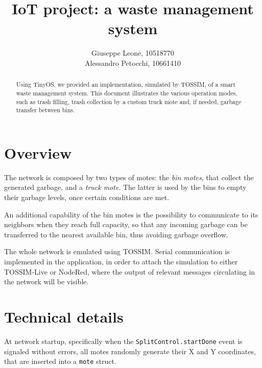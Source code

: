 \documentclass[a4paper,10pt]{article}
\title{IoT project: a waste management system}
\author{Giuseppe Leone, 10518770 \\ Alessandro Petocchi, 10661410}
\date{}
\begin{document}
\maketitle
\begin{abstract}
	\noindent Using TinyOS, we provided an implementation, simulated by TOSSIM, of a smart waste management system. This document illustrates the various operation modes, such as trash filling, trash collection by a custom truck mote and, if needed, garbage transfer between bins. 
\end{abstract}

\section{Overview}
The network is composed by two types of motes: the \textit{bin motes}, that collect the generated garbage, and a \textit{truck mote}. The latter is used by the bins to empty their garbage levels, once certain conditions are met.

\noindent An additional capability of the bin motes is the possibility to communicate to its neighbors when they reach full capacity, so that any incoming garbage can be transferred to the nearest available bin, thus avoiding garbage overflow.

\noindent The whole network is emulated using TOSSIM. Serial communication is implemented in the application, in order to attach the simulation to either TOSSIM-Live or NodeRed, where the output of relevant messages circulating in the network will be visible.
\section{Technical details}
At network startup, specifically when the \texttt{SplitControl.startDone} event is signaled without errors, all motes randomly generate their X and Y coordinates, that are inserted into a \texttt{mote} struct. 
\end{document}
